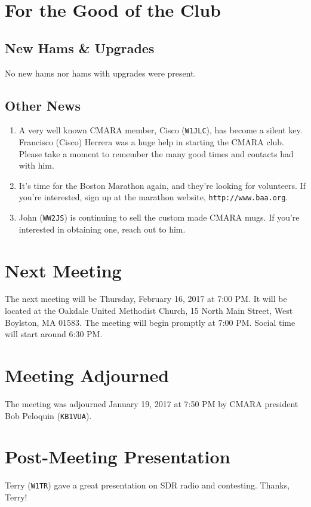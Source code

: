 \documentclass[10pt,letterpaper]{article}
\begin{document}
\section{For the Good of the Club}

\subsection{New Hams \& Upgrades}
No new hams nor hams with upgrades were present.

\subsection{Other News}
\begin{enumerate}
  \item A very well known CMARA member, Cisco (\texttt{W1JLC}), has become a silent key. Francisco (Cisco) Herrera was a huge help in starting the CMARA club. Please take a moment to remember the many good times and contacts had with him.
  \item It's time for the Boston Marathon again, and they're looking for volunteers. If you're interested, sign up at the marathon website, \texttt{http://www.baa.org}.
  \item John (\texttt{WW2JS}) is continuing to sell the custom made CMARA mugs. If you're interested in obtaining one, reach out to him.
\end{enumerate}

\section{Next Meeting}
The next meeting will be Thursday, February 16, 2017 at 7:00 PM. It will be located at the Oakdale United Methodist Church, 15 North Main Street, West Boylston, MA 01583. The meeting will begin promptly at 7:00 PM. Social time will start around 6:30 PM.

\section{Meeting Adjourned}
The meeting was adjourned January 19, 2017 at 7:50 PM by CMARA president Bob Peloquin (\texttt{KB1VUA}).

\section{Post-Meeting Presentation}
Terry (\texttt{W1TR}) gave a great presentation on SDR radio and contesting. Thanks, Terry!
\end{document}
